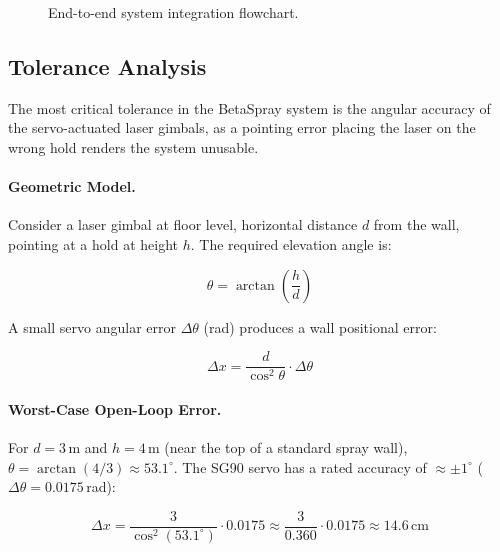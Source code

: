 \documentclass[12pt]{extarticle}
\begin{document}
\begin{figure}[H]
\centering
{}
\caption{End-to-end system integration flowchart.}
\label{fig:flow-integration}
\end{figure}

\subsection{Tolerance Analysis}
\label{sec:tolerance}

The most critical tolerance in the BetaSpray system is the angular accuracy of the
servo-actuated laser gimbals, as a pointing error placing the laser on the wrong hold renders
the system unusable.

\paragraph{Geometric Model.}
Consider a laser gimbal at floor level, horizontal distance $d$ from the wall, pointing at a
hold at height $h$. The required elevation angle is:

\begin{equation}
    \theta = \arctan\!\left(\frac{h}{d}\right)
\end{equation}

A small servo angular error $\Delta\theta$ (rad) produces a wall positional error:

\begin{equation}
    \Delta x = \frac{d}{\cos^2\!\theta} \cdot \Delta\theta
\end{equation}

\paragraph{Worst-Case Open-Loop Error.}
For $d = 3$\,m and $h = 4$\,m (near the top of a standard spray wall),
$\theta = \arctan(4/3) \approx 53.1^\circ$. The SG90 servo has a rated accuracy of
$\approx \pm1^\circ$ ($\Delta\theta = 0.0175$\,rad):

\begin{equation}
    \Delta x = \frac{3}{\cos^2(53.1^\circ)} \cdot 0.0175 \approx \frac{3}{0.360} \cdot 0.0175
    \approx 14.6\,\text{cm}
\end{equation}
\end{document}
